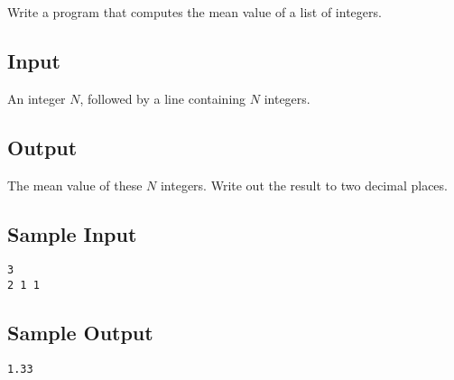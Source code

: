 

Write a program that computes the mean value of a list of integers.

\subsection*{Input}

An integer $N$, followed by a line containing $N$ integers.

\subsection*{Output}

The mean value of these $N$ integers. Write out the result to two decimal places.

\subsection*{Sample Input}

\begin{verbatim}
3
2 1 1
\end{verbatim}

\subsection*{Sample Output}

\begin{verbatim}
1.33
\end{verbatim}
